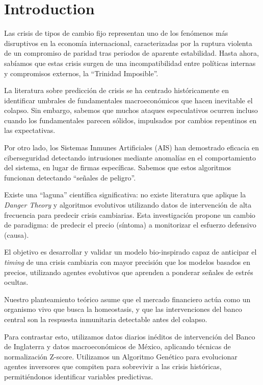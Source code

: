 \section{Introduction}

Las crisis de tipos de cambio fijo representan uno de los fenómenos más disruptivos en la economía internacional, caracterizadas por la ruptura violenta de un compromiso de paridad tras periodos de aparente estabilidad. Hasta ahora, sabíamos que estas crisis surgen de una incompatibilidad entre políticas internas y compromisos externos, la ``Trinidad Imposible''.\cite{krugman1979,obstfeld1996}

La literatura sobre predicción de crisis se ha centrado históricamente en identificar umbrales de fundamentales macroeconómicos que hacen inevitable el colapso.\cite{krugman1979} Sin embargo, sabemos que muchos ataques especulativos ocurren incluso cuando los fundamentales parecen sólidos, impulsados por cambios repentinos en las expectativas.\cite{obstfeld1994,obstfeld1996}

Por otro lado, los Sistemas Inmunes Artificiales (AIS) han demostrado eficacia en ciberseguridad detectando intrusiones mediante anomalías en el comportamiento del sistema, en lugar de firmas específicas.\cite{forrest1994,dasgupta1999} Sabemos que estos algoritmos funcionan detectando ``señales de peligro''.\cite{matzinger1994,matzinger2002}

Existe una ``laguna'' científica significativa: no existe literatura que aplique la \textit{Danger Theory} y algoritmos evolutivos utilizando datos de intervención de alta frecuencia para predecir crisis cambiarias.\cite{matzinger1994,matzinger2002,naef2022} Esta investigación propone un cambio de paradigma: de predecir el precio (síntoma) a monitorizar el esfuerzo defensivo (causa).

El objetivo es desarrollar y validar un modelo bio-inspirado capaz de anticipar el \textit{timing} de una crisis cambiaria con mayor precisión que los modelos basados en precios, utilizando agentes evolutivos que aprenden a ponderar señales de estrés ocultas.

Nuestro planteamiento teórico asume que el mercado financiero actúa como un organismo vivo que busca la homeostasis, y que las intervenciones del banco central son la respuesta inmunitaria detectable antes del colapso.\cite{naef2022}

Para contrastar esto, utilizamos datos diarios inéditos de intervención del Banco de Inglaterra y datos macroeconómicos de México, aplicando técnicas de normalización Z-score.\cite{naef2022} Utilizamos un Algoritmo Genético para evolucionar agentes inversores que compiten para sobrevivir a las crisis históricas, permitiéndonos identificar variables predictivas.



